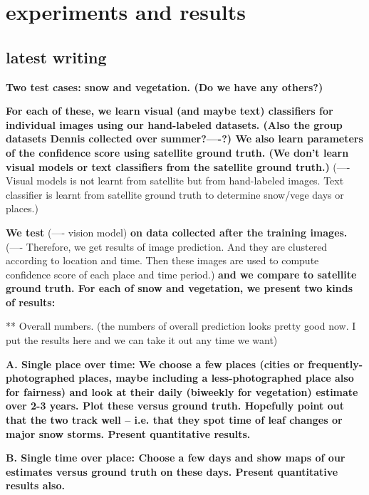 \section{experiments and results}


\hfill \break
\hfill \break
\subsection*{latest writing}
\hfill \break
\hfill \break

\textbf{
Two test cases: snow and vegetation. (Do we have any others?)
}

\textbf{
For each of these, we learn visual (and maybe text) classifiers for individual images using our hand-labeled datasets. (Also the group datasets Dennis collected over summer?----?) We also learn parameters of the confidence score using satellite ground truth. (We don't learn visual models or text classifiers from the satellite ground truth.)}
(---- Visual models  is not learnt from satellite but from hand-labeled images. Text classifier is learnt from satellite ground truth to determine snow/vege days or places.) 

\textbf{We test }
(---- vision model) 
\textbf{on data collected after the training images.}                                             
(---- Therefore, we get results of image prediction. And they are clustered according to location and time. Then these images are used to compute confidence score of each place and time period.)
\textbf{and we compare to satellite ground truth. For each of snow and vegetation, we present two kinds of results:}

** Overall numbers.
 (the numbers of overall prediction looks pretty good now. I put the results here and we can take it out any time we want)

\textbf{
A. Single place over time: We choose a few places (cities or frequently-photographed places, maybe including a less-photographed place also for fairness) and look at their daily (biweekly for vegetation) estimate over 2-3 years. Plot these versus ground truth. Hopefully point out that the two track well -- i.e. that they spot time of leaf changes or major snow storms. Present quantitative results.
}

\textbf{
B. Single time over place: Choose a few days and show maps of our estimates versus ground truth on these days. Present quantitative results also.
}

